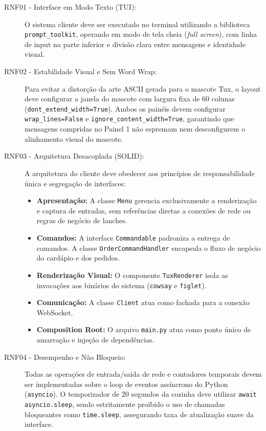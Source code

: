 \documentclass[12pt]{article}
\begin{document}
\begin{description}
    \item[RNF01 - Interface em Modo Texto (TUI):] O sistema cliente deve ser executado no terminal utilizando a biblioteca \texttt{prompt\_toolkit}, operando em modo de tela cheia (\textit{full screen}), com linha de input na parte inferior e divisão clara entre mensagens e identidade visual.

    \item[RNF02 - Estabilidade Visual e Sem Word Wrap:] Para evitar a distorção da arte ASCII gerada para o mascote Tux, o layout deve configurar a janela do mascote com largura fixa de 60 colunas (\texttt{dont\_extend\_width=True}). Ambos os painéis devem configurar \texttt{wrap\_lines=False} e \texttt{ignore\_content\_width=True}, garantindo que mensagens compridas no Painel 1 não espremam nem desconfigurem o alinhamento visual do mascote.

    \item[RNF03 - Arquitetura Desacoplada (SOLID):] A arquitetura do cliente deve obedecer aos princípios de responsabilidade única e segregação de interfaces:
    \begin{itemize}
        \item \textbf{Apresentação:} A classe \texttt{Menu} gerencia exclusivamente a renderização e captura de entradas, sem referências diretas a conexões de rede ou regras de negócio de lanches.
        \item \textbf{Comandos:} A interface \texttt{Commandable} padroniza a entrega de comandos. A classe \texttt{OrderCommandHandler} encapsula o fluxo de negócio do cardápio e dos pedidos.
        \item \textbf{Renderização Visual:} O componente \texttt{TuxRenderer} isola as invocações aos binários do sistema (\texttt{cowsay} e \texttt{figlet}).
        \item \textbf{Comunicação:} A classe \texttt{Client} atua como fachada para a conexão WebSocket.
        \item \textbf{Composition Root:} O arquivo \texttt{main.py} atua como ponto único de amarração e injeção de dependências.
    \end{itemize}

    \item[RNF04 - Desempenho e Não Bloqueio:] Todas as operações de entrada/saída de rede e contadores temporais devem ser implementadas sobre o loop de eventos assíncrono do Python (\texttt{asyncio}). O temporizador de 20 segundos da cozinha deve utilizar \texttt{await asyncio.sleep}, sendo estritamente proibido o uso de chamadas bloqueantes como \texttt{time.sleep}, assegurando taxa de atualização suave da interface.


\end{description}
\end{document}
